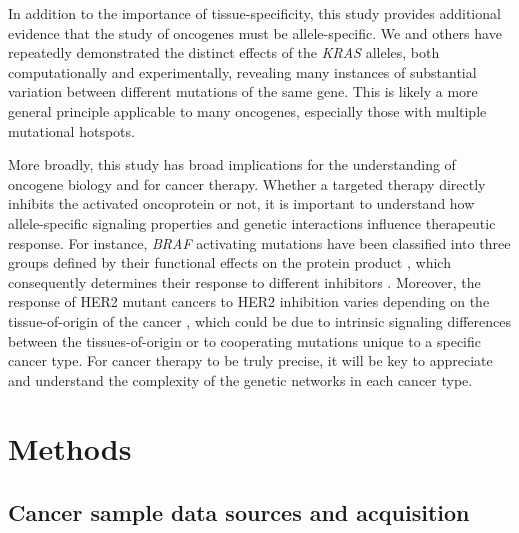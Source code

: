 \documentclass[english, 10pt, letterpaper]{article}
\newcommand{\KRAS}{\emph{KRAS}}
\begin{document}
In addition to the importance of tissue-specificity, this study provides additional evidence that the study of oncogenes must be allele-specific.
We and others have repeatedly demonstrated the distinct effects of the \KRAS{} alleles, both computationally and experimentally, revealing many instances of substantial variation between different mutations of the same gene.
This is likely a more general principle applicable to many oncogenes, especially those with multiple mutational hotspots.


More broadly, this study has broad implications for the understanding of oncogene biology and for cancer therapy.
Whether a targeted therapy directly inhibits the activated oncoprotein or not, it is important to understand how allele-specific signaling properties and genetic interactions influence therapeutic response.
For instance, \emph{BRAF} activating mutations have been classified into three groups defined by their functional effects on the protein product \cite{Yao2015BRAFInhibition., Yao2017TumoursRAS.}, which consequently determines their response to different inhibitors \cite{Dagogo-Jack2019, Bracht2019BRAFRationale.}.
Moreover, the response of HER2 mutant cancers to HER2 inhibition varies depending on the tissue-of-origin of the cancer \cite{Hyman2018HERCancers}, which could be due to intrinsic signaling differences between the tissues-of-origin or to cooperating mutations unique to a specific cancer type. 
For cancer therapy to be truly precise, it will be key to appreciate and understand the complexity of the genetic networks in each cancer type.




\section*{Methods}

\subsection*{Cancer sample data sources and acquisition}
\end{document}
